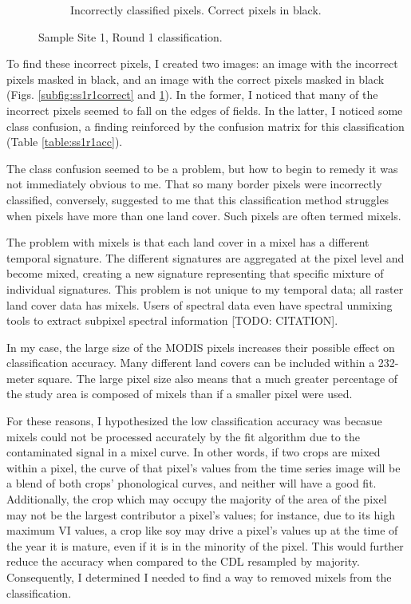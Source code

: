\begin{Spacing}{1.2}
\begin{figure}
\begin{subfigure}[b]{.475\textwidth}
    \caption{Incorrectly classified pixels. Correct pixels in black.}
    \label{subfig:ss1r1incorrect}
  \end{subfigure}
  \caption{Sample Site 1, Round 1 classification.}
  \label{fig:ss1r1class}
\end{figure}
\end{Spacing}

To find these incorrect pixels, I created two images: an image with the incorrect pixels masked in black, and an image with the correct pixels masked in black (Figs. \ref{subfig:ss1r1correct} and \ref{subfig:ss1r1incorrect}). In the former, I noticed that many of the incorrect pixels seemed to fall on the edges of fields. In the latter, I noticed some class confusion, a finding reinforced by the confusion matrix for this classification (Table \ref{table:ss1r1acc}).

The class confusion seemed to be a problem, but how to begin to remedy it was not immediately obvious to me. That so many border pixels were incorrectly classified, conversely, suggested to me that this classification method struggles when pixels have more than one land cover. Such pixels are often termed mixels.

The problem with mixels is that each land cover in a mixel has a different temporal signature. The different signatures are aggregated at the pixel level and become mixed, creating a new signature representing that specific mixture of individual signatures. This problem is not unique to my temporal data; all raster land cover data has mixels. Users of spectral data even have spectral unmixing tools to extract subpixel spectral information [TODO: CITATION].

In my case, the large size of the MODIS pixels increases their possible effect on classification accuracy. Many different land covers can be included within a 232-meter square. The large pixel size also means that a much greater percentage of the study area is composed of mixels than if a smaller pixel were used.

For these reasons, I hypothesized the low classification accuracy was becasue mixels could not be processed accurately by the fit algorithm due to the contaminated signal in a mixel curve. In other words, if two crops are mixed within a pixel, the curve of that pixel’s values from the time series image will be a blend of both crops’ phonological curves, and neither will have a good fit. Additionally, the crop which may occupy the majority of the area of the pixel may not be the largest contributor a pixel’s values; for instance, due to its high maximum VI values, a crop like soy may drive a pixel’s values up at the time of the year it is mature, even if it is in the minority of the pixel. This would further reduce the accuracy when compared to the CDL resampled by majority. Consequently, I determined I needed to find a way to removed mixels from the classification.

